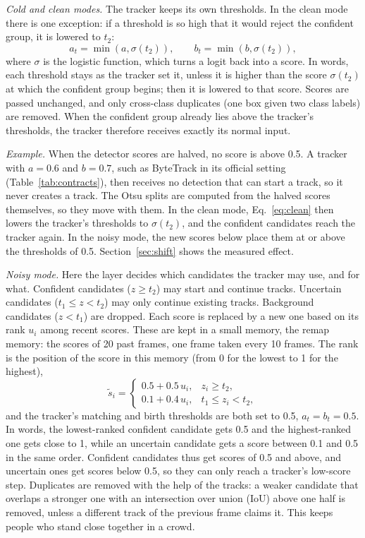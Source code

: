 \documentclass[pdflatex,sn-mathphys-num,iicol]{sn-jnl}
\begin{document}
\emph{Cold and clean modes.} The tracker keeps its own thresholds. In the
clean mode there is one exception: if a threshold is so high that it would
reject the confident group, it is lowered to $t_2$:
\begin{equation}
a_t=\min\!\left(a,\sigma(t_2)\right),\qquad b_t=\min\!\left(b,\sigma(t_2)\right),
\label{eq:clean}
\end{equation}
where $\sigma$ is the logistic function, which turns a logit back into a
score. In words, each threshold stays as the tracker set it, unless it is
higher than the score $\sigma(t_2)$ at which the confident group begins; then
it is lowered to that score. Scores are passed unchanged, and only cross-class duplicates (one box
given two class labels) are removed. When the confident group already lies
above the tracker's thresholds, the tracker therefore receives exactly its
normal input.

\emph{Example.} When the detector scores are halved, no score is above 0.5.
A tracker with $a=0.6$ and $b=0.7$, such as ByteTrack in its official setting
(Table~\ref{tab:contracts}), then receives no detection that can start a
track, so it never creates a track. The Otsu splits are computed from the
halved scores themselves, so they move with them. In the clean mode,
Eq.~\eqref{eq:clean} then lowers the tracker's thresholds to $\sigma(t_2)$,
and the confident candidates reach the tracker again. In the noisy mode, the
new scores below place them at or above the thresholds of 0.5.
Section~\ref{sec:shift} shows the measured effect.

\emph{Noisy mode.} Here the layer decides which candidates the tracker may
use, and for what. Confident candidates ($z\ge t_2$) may start and continue
tracks. Uncertain candidates ($t_1\le z<t_2$) may only continue existing
tracks. Background candidates ($z<t_1$) are dropped. Each score is replaced
by a new one based on its rank $u_i$ among recent scores. These are kept in a
small memory, the remap memory: the scores of 20 past frames, one frame taken
every 10 frames. The rank is the position of the score in this memory (from 0 for the
lowest to 1 for the highest),
\begin{equation}
\tilde{s}_i=
\begin{cases}
0.5+0.5\,u_i, & z_i\ge t_2,\\
0.1+0.4\,u_i, & t_1\le z_i<t_2,
\end{cases}
\label{eq:remap}
\end{equation}
and the tracker's matching and birth thresholds are both set to 0.5,
$a_t=b_t=0.5$. In words, the lowest-ranked confident candidate gets 0.5 and
the highest-ranked one gets close to 1, while an uncertain candidate gets a
score between 0.1 and 0.5 in the same order. Confident candidates thus get
scores of 0.5 and above, and
uncertain ones get scores below 0.5, so they can only reach a tracker's
low-score step. Duplicates are removed with the help of the tracks: a weaker
candidate that overlaps a stronger one with an intersection over union (IoU)
above one half is removed, unless a different track of the previous frame
claims it. This keeps people who stand close together in a crowd.
\end{document}
